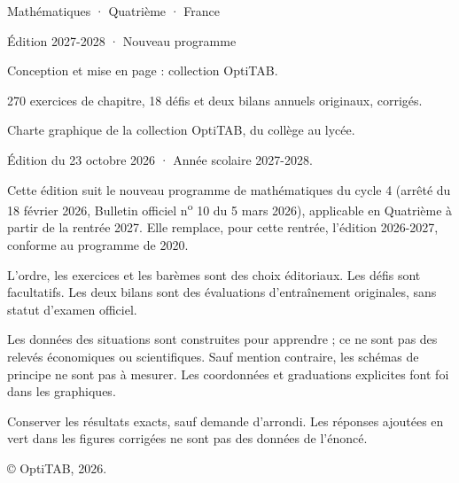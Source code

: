 \thispagestyle{empty}\vspace*{\fill}
\begin{minipage}{128mm}\fontsize{9}{13}\selectfont\color{otMuted}
{\otSemi\color{otInk}Mathématiques · Quatrième · France}\par
{\otSemi\color{otGreenDark}Édition 2027-2028 · Nouveau programme}\par\medskip
Conception et mise en page : collection OptiTAB.\par
270 exercices de chapitre, 18 défis et deux bilans annuels originaux, corrigés.\par
Charte graphique de la collection OptiTAB, du collège au lycée.\par\bigskip
Édition du 23 octobre 2026 · Année scolaire 2027-2028.\par\bigskip
Cette édition suit le nouveau programme de mathématiques du cycle 4
(arrêté du 18 février 2026, Bulletin officiel n\textsuperscript{o} 10 du 5 mars 2026),
applicable en Quatrième à partir de la rentrée 2027. Elle remplace, pour
cette rentrée, l’édition 2026-2027, conforme au programme de 2020.\par\bigskip
L’ordre, les exercices et les barèmes sont des choix éditoriaux. Les défis sont
facultatifs. Les deux bilans sont des évaluations d’entraînement originales,
sans statut d’examen officiel.\par\bigskip
Les données des situations sont construites pour apprendre ; ce ne sont pas
des relevés économiques ou scientifiques. Sauf mention contraire, les
schémas de principe ne sont pas à mesurer. Les coordonnées et graduations
explicites font foi dans les graphiques.\par\bigskip
Conserver les résultats exacts, sauf demande d’arrondi. Les réponses ajoutées
en vert dans les figures corrigées ne sont pas des données de l’énoncé.\par\bigskip
© OptiTAB, 2026.\par\otSite
\end{minipage}\clearpage
